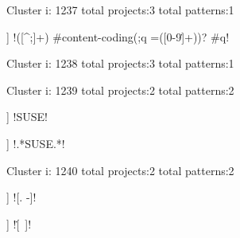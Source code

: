 Cluster i: 1237
total projects:3
total patterns:1
\begin{multicols}{1}
\begin{description}[noitemsep,topsep=0pt]
\item [[3] ] \cverb!\n                            \s* ([^\s;]+) \s*            #content-coding\n                            (;\s* q \s*=\s* ([0-9\.]+))? #q\n                            !
\end{description}
\end{multicols}







Cluster i: 1238
total projects:3
total patterns:1
\begin{multicols}{1}
\end{multicols}







Cluster i: 1239
total projects:2
total patterns:2
\begin{multicols}{1}
\begin{description}[noitemsep,topsep=0pt]
\item [[2] ] \cverb!SUSE!
\item [[2] ] \cverb!.*SUSE.*!
\end{description}
\end{multicols}







Cluster i: 1240
total projects:2
total patterns:2
\begin{multicols}{1}
\begin{description}[noitemsep,topsep=0pt]
\item [[2] ] \cverb![. -]!
\item [[2] ] \cverb![\.\-\ ]!
\end{description}
\end{multicols}







